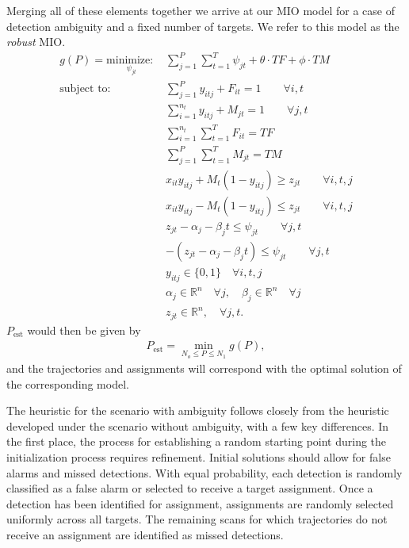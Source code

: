 Merging all of these elements together we arrive at our MIO model for a case of detection ambiguity and a fixed number of targets. We refer to this model as the \textit{robust} MIO. 
\begin{align}
g(P)=\underset{\psi_{jt}}{\text{minimize: }} & \sum_{j=1}^{P} \sum_{t=1}^{T} \psi_{jt} + \theta \cdot TF + \phi \cdot TM \label{eq:simple_robust}\\
\text{subject to: }	& \sum_{j=1}^{P} y_{itj} + F_{it} = 1 \qquad \forall i,t \nonumber \\
				& \sum_{i=1}^{n_{t}} y_{itj} + M_{jt} = 1 \qquad \forall j,t \nonumber\\
				& \sum_{i=1}^{n_{t}} \sum_{t=1}^{T} F_{it} = TF \nonumber \\
				& \sum_{j=1}^{P} \sum_{t=1}^{T} M_{jt} = TM \nonumber \\
				& x_{it}y_{itj} + M_{t}(1-y_{itj}) \geq z_{jt} \qquad \forall i,t,j \nonumber \\
				& x_{it}y_{itj} - M_{t}(1-y_{itj}) \leq z_{jt} \qquad \forall i,t,j \nonumber \\
				& z_{jt} - \alpha_{j} - \beta_{j}t \leq \psi_{jt} \qquad \forall j,t \nonumber \\
				& -(z_{jt} - \alpha_{j} - \beta_{j}t) \leq \psi_{jt} \qquad \forall j,t \nonumber \\
				& y_{itj} \in \{0,1\} \quad \forall i,t,j \nonumber \\
				& \alpha_{j} \in \mathbb{R}^n \quad \forall j ,\quad \beta_{j} \in \mathbb{R}^n \quad \forall j \nonumber\\
				& z_{jt} \in \mathbb{R}^n, \quad \forall j,t. \nonumber
\end{align}
$P_\text{est}$ would then be given by
\begin{align*}
P_\text{est}=\min_{N_o\leq P\leq N_1} g(P),
\end{align*}
and the trajectories and assignments will correspond with the optimal solution of the corresponding model.

The heuristic for the scenario with ambiguity follows closely from the heuristic developed under the scenario without ambiguity, with a few key differences. In the first place, the process for establishing a random starting point during the initialization process requires refinement. Initial solutions should allow for false alarms and missed detections. With equal probability, each detection is randomly classified as a false alarm or selected to receive a target assignment. Once a detection has been identified for assignment, assignments are randomly selected uniformly across all targets. The remaining scans for which trajectories do not receive an assignment are identified as missed detections. 

